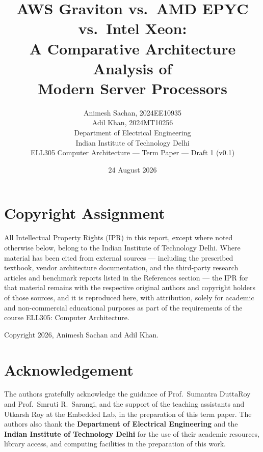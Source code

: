 \documentclass[12pt,a4paper]{article}
\title{\textbf{AWS Graviton vs.\ AMD EPYC vs.\ Intel Xeon:\\
A Comparative Architecture Analysis of\\ Modern Server Processors}}
\author{
  {Animesh Sachan, 2024EE10935} \\
  {Adil Khan, 2024MT10256} \\[6pt]
  Department of Electrical Engineering \\
  Indian Institute of Technology Delhi \\[4pt]
  ELL305 Computer Architecture --- Term Paper --- Draft 1 (v0.1)
}
\date{24 August 2026}
\begin{document}
\maketitle

\clearpage
\thispagestyle{empty}
\section*{Copyright Assignment}
All Intellectual Property Rights (IPR) in this report, except where
noted otherwise below, belong to the Indian Institute of Technology
Delhi. Where material has been cited from external sources --- including
the prescribed textbook, vendor architecture documentation, and the
third-party research articles and benchmark reports listed in the
References section --- the IPR for that material remains with the
respective original authors and copyright holders of those sources, and
it is reproduced here, with attribution, solely for academic and
non-commercial educational purposes as part of the requirements of the
course ELL305: Computer Architecture.

\bigskip
\noindent Copyright \textcopyright{} 2026, Animesh Sachan and Adil Khan.

\clearpage
\thispagestyle{empty}
\section*{Acknowledgement}
The authors gratefully acknowledge the guidance of Prof.\ Sumantra
DuttaRoy and Prof.\ Smruti R.\ Sarangi, and the support of the teaching
assistants and Utkarsh Roy at the Embedded Lab, in the preparation of
this term paper. The authors also thank the \textbf{Department of
Electrical Engineering} and the \textbf{Indian Institute of Technology
Delhi} for the use of their academic resources, library access, and
computing facilities in the preparation of this work.
\end{document}
